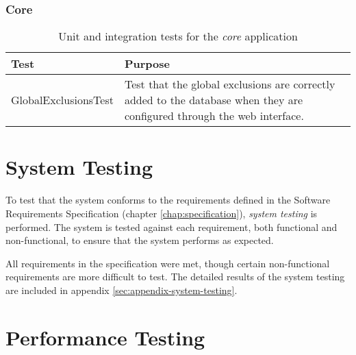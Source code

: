 \subsubsection{Core}

\begin{table}[H]
    \centering
    \begin{tabular}{ l  p{7cm} }
        \toprule
        Test                        & Purpose
        \\ \midrule
        GlobalExclusionsTest        & Test that the global exclusions are
                                      correctly added to the database when
                                      they are configured through the web
                                      interface.
        \\ \bottomrule
    \end{tabular}
    \caption{Unit and integration tests for the \emph{core} application}
    \label{tab:tests-core}
\end{table}

\section{System Testing}

To test that the system conforms to the requirements defined in the Software
Requirements Specification (chapter \ref{chap:specification}), \emph{system
testing} is performed. The system is tested against each requirement, both
functional and non-functional, to ensure that the system performs as expected.

All requirements in the specification were met, though certain non-functional
requirements are more difficult to test. The detailed results of the system
testing are included in appendix \ref{sec:appendix-system-testing}.

\section{Performance Testing}

